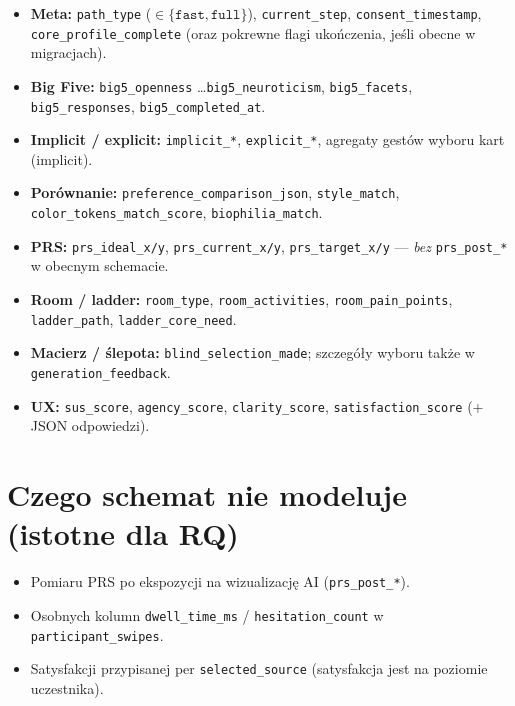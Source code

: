 \begin{itemize}
  \item \textbf{Meta:} \texttt{path\_type} ($\in\{\texttt{fast},\texttt{full}\}$), \texttt{current\_step}, \texttt{consent\_timestamp}, \texttt{core\_profile\_complete} (oraz pokrewne flagi ukończenia, jeśli obecne w migracjach).
  \item \textbf{Big Five:} \texttt{big5\_openness} \ldots \texttt{big5\_neuroticism}, \texttt{big5\_facets}, \texttt{big5\_responses}, \texttt{big5\_completed\_at}.
  \item \textbf{Implicit / explicit:} \texttt{implicit\_*}, \texttt{explicit\_*}, agregaty gestów wyboru kart (implicit).
  \item \textbf{Porównanie:} \texttt{preference\_comparison\_json}, \texttt{style\_match}, \texttt{color\_tokens\_match\_score}, \texttt{biophilia\_match}.
  \item \textbf{PRS:} \texttt{prs\_ideal\_x/y}, \texttt{prs\_current\_x/y}, \texttt{prs\_target\_x/y} --- \emph{bez} \texttt{prs\_post\_*} w obecnym schemacie.
  \item \textbf{Room / ladder:} \texttt{room\_type}, \texttt{room\_activities}, \texttt{room\_pain\_points}, \texttt{ladder\_path}, \texttt{ladder\_core\_need}.
  \item \textbf{Macierz / ślepota:} \texttt{blind\_selection\_made}; szczegóły wyboru także w \texttt{generation\_feedback}.
  \item \textbf{UX:} \texttt{sus\_score}, \texttt{agency\_score}, \texttt{clarity\_score}, \texttt{satisfaction\_score} (+ JSON odpowiedzi).
\end{itemize}

\section{Czego schemat nie modeluje (istotne dla RQ)}
\label{app:a:sec:luki}

\begin{itemize}
  \item Pomiaru PRS po ekspozycji na wizualizację AI (\texttt{prs\_post\_*}).
  \item Osobnych kolumn \texttt{dwell\_time\_ms} / \texttt{hesitation\_count} w \texttt{participant\_swipes}.
  \item Satysfakcji przypisanej per \texttt{selected\_source} (satysfakcja jest na poziomie uczestnika).
\end{itemize}

